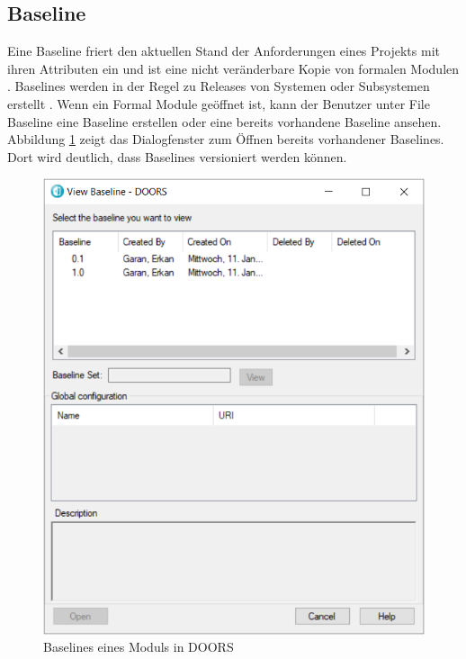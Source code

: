 \subsection{Baseline}
Eine Baseline friert den aktuellen Stand der Anforderungen eines Projekts mit ihren Attributen ein und ist eine nicht veränderbare Kopie von 
formalen Modulen \cite[vgl. S.182]{DOORS}. Baselines werden in der Regel zu Releases von Systemen oder Subsystemen erstellt \cite[vgl. S.60]{SMO-PE}. 
Wenn ein Formal Module geöffnet ist, kann der Benutzer unter File \textrightarrow{} Baseline eine Baseline erstellen oder eine bereits vorhandene 
Baseline ansehen. Abbildung \ref*{fig:Baselines} zeigt das Dialogfenster zum Öffnen bereits vorhandener Baselines. Dort wird deutlich, 
dass Baselines versioniert werden können.

\begin{figure}[H]
    \centering
    \includegraphics[scale = 0.7]{abbildungen/Baselines.PNG}
    \caption{Baselines eines Moduls in \acs{DOORS}}
    \label{fig:Baselines}
\end{figure}

